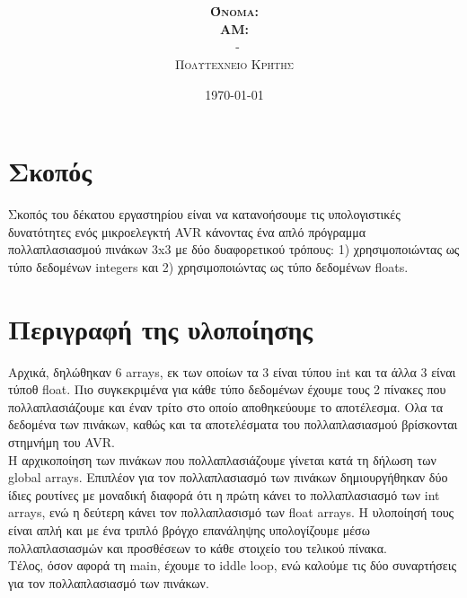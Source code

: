 \documentclass{article}
\title{\underline{\textbf{\assignmentNumber}}}
\author{\textsc{\textbf{Όνομα:}}  \studentName\\
		\textsc{\textbf{ΑΜ:}}  \studentNumber\\
		\course \ - \courseName\\ 
		\textsc{Πολυτεχνείο Κρήτης}
		}
\date{\today}
\begin{document}
	\maketitle

\section*{Σκοπός}
	Σκοπός του δέκατου εργαστηρίου είναι να κατανοήσουμε τις υπολογιστικές δυνατότητες ενός μικροελεγκτή AVR κάνοντας ένα απλό πρόγραμμα πολλαπλασιασμού πινάκων 3x3 με δύο δυαφορετικού τρόπους: 1) χρησιμοποιώντας ως τύπο δεδομένων integers και 2) χρησιμοποιώντας ως τύπο δεδομένων floats. 

\section*{Περιγραφή της υλοποίησης}
	Αρχικά, δηλώθηκαν 6 arrays, εκ των οποίων τα 3 είναι τύπου int και τα άλλα 3 είναι τύποθ float. Πιο συγκεκριμένα για κάθε τύπο δεδομένων έχουμε τους 2 πίνακες που πολλαπλασιάζουμε και έναν τρίτο στο οποίο αποθηκεύουμε το αποτέλεσμα. Ολα τα δεδομένα των πινάκων, καθώς και τα αποτελέσματα του πολλαπλασιασμού βρίσκονται στημνήμη του AVR. \\
	
	\noindent
	H αρχικοποίηση των πινάκων που πολλαπλασιάζουμε γίνεται κατά τη δήλωση των global arrays. Επιπλέον για τον πολλαπλασιασμό των πινάκων δημιουργήθηκαν δύο ίδιες ρουτίνες με μοναδική διαφορά ότι η πρώτη κάνει το πολλαπλασιασμό των int arrays, ενώ η δεύτερη κάνει τον πολλαπλασισμό των float arrays. H υλοποίησή τους είναι απλή και με ένα τριπλό βρόγχο επανάληψης υπολογίζουμε μέσω πολλαπλασιασμών και προσθέσεων το κάθε στοιχείο του τελικού πίνακα.\\
	
	\noindent
	Τέλος, όσον αφορά τη main, έχουμε το iddle loop, ενώ καλούμε τις δύο συναρτήσεις για τον πολλαπλασιασμό των πινάκων.
	
\end{document}
